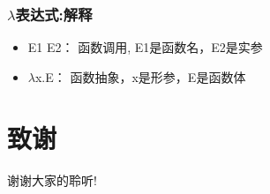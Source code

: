 \documentclass[CJKutf8,compress,hyperref]{beamer}
\begin{document}
\begin{CJK}{UTF8}{song}
\begin{frame} 
  \frametitle{ $\lambda$表达式:解释} 
  \begin{itemize}
  \item{E1 E2}： 函数调用, E1是函数名，E2是实参 
  \item{$\lambda$x.E}： 函数抽象，x是形参，E是函数体
  \end{itemize} 

\end{frame}

\section{致谢}
\begin{frame}
  \begin{Huge}
    \begin{center}
      谢谢大家的聆听!
    \end{center}
  \end{Huge}
\end{frame}
\end{CJK}
\end{document}
